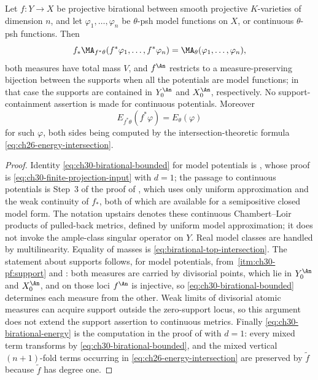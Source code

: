 \begin{theorem}
\label{thm:ch30-birational-identification}
Let $f:Y\to X$ be projective birational between smooth projective
$K$-varieties of dimension $n$, and let $\varphi_1,\ldots,\varphi_n$
be $\theta$-psh model functions on $X$, or continuous
$\theta$-psh functions.  Then
\begin{equation}
\label{eq:ch30-birational-bounded}
 f_*\MA_{f^*\theta}(f^*\varphi_1,\ldots,f^*\varphi_n)
 =\MA_\theta(\varphi_1,\ldots,\varphi_n),
\end{equation}
both measures have total mass $V$, and $f^{\An}$ restricts to a
measure-preserving bijection between the supports when all the potentials
are model functions; in that case the supports are contained in
$Y^{\An}_0$ and $X^{\An}_0$, respectively.  No support-containment
assertion is made for continuous potentials.  Moreover
\begin{equation}
\label{eq:ch30-birational-energy}
 E_{f^*\theta}(f^*\varphi)=E_\theta(\varphi)
\end{equation}
for such $\varphi$, both sides being computed by the
intersection-theoretic formula \eqref{eq:ch26-energy-intersection}.
\end{theorem}

\begin{proof}
Identity \eqref{eq:ch30-birational-bounded} for model potentials is
, whose proof is
\eqref{eq:ch30-finite-projection-input} with $d=1$; the passage to
continuous potentials is Step~3 of the proof of
, which uses only uniform approximation and
the weak continuity of $f_*$, both of which are available for a
semipositive closed model form.  The notation upstairs denotes these
continuous Chambert--Loir products of pulled-back metrics, defined by
uniform model approximation; it does not invoke the ample-class singular
operator on $Y$.  Real model classes are handled by multilinearity.
Equality of masses is
\eqref{eq:birational-top-intersection}.  The statement about supports
follows, for model potentials, from
\,\cref{itm:ch30-pf:support} and
: both measures are carried by
divisorial points, which lie in $Y^{\An}_0$ and $X^{\An}_0$, and on
those loci $f^{\An}$ is injective, so
\eqref{eq:ch30-birational-bounded} determines each measure from the other.
Weak limits of divisorial atomic measures can acquire support outside the
zero-support locus, so this argument does not extend the support assertion
to continuous metrics.  Finally
\eqref{eq:ch30-birational-energy} is the computation in the proof of
 with $d=1$: every mixed term
transforms by \eqref{eq:ch30-birational-bounded}, and the
mixed vertical $(n+1)$-fold terms occurring in
\eqref{eq:ch26-energy-intersection} are preserved by
$\tilde f$ because $\tilde f$ has degree one.
\end{proof}

